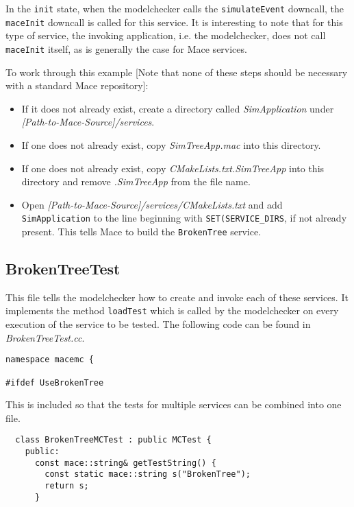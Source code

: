 \documentclass[12pt,letterpaper]{article}
\newenvironment{code}
{\begin{list}{}{\setlength{\leftmargin}{1em}}\item\scriptsize\bfseries}
{\end{list}}
\begin{document}
In the \texttt{init} state, when the modelchecker calls the \texttt{simulateEvent} downcall, the \texttt{maceInit} downcall is called for this service.  It is interesting to note that for this type of service, the invoking application, i.e. the modelchecker, does not call \texttt{maceInit} itself, as is generally the case for Mace services.  


To work through this example [Note that none of these steps should be necessary with a standard Mace repository]:
\begin{itemize} 
\item If it does not already exist, create a directory called \emph{SimApplication} under \emph{[Path-to-Mace-Source]/services}.  
\item If one does not already exist, copy \emph{SimTreeApp.mac} into this directory.  
\item If one does not already exist, copy \emph{CMakeLists.txt.SimTreeApp} into this directory and remove \emph{.SimTreeApp} from the file name.
\item Open \emph{[Path-to-Mace-Source]/services/CMakeLists.txt} and add \texttt{SimApplication} to the line beginning with \texttt{SET(SERVICE\_DIRS}, if not already present.  This tells Mace to build the \texttt{BrokenTree} service.
\end{itemize}

\subsection{BrokenTreeTest}
\label{BrokenTreeTest}

This file tells the modelchecker how to create and invoke each of these services.  It implements the method \texttt{loadTest} which is called by the modelchecker on every execution of the service to be tested.  The following code can be found in \emph{BrokenTreeTest.cc}.

\begin{code}
\begin{verbatim} 
namespace macemc {

#ifdef UseBrokenTree
\end{verbatim}
\end{code}

This is included so that the tests for multiple services can be combined into one file. 

\begin{code}
\begin{verbatim} 
  class BrokenTreeMCTest : public MCTest {
    public:
      const mace::string& getTestString() {
        const static mace::string s("BrokenTree");
        return s;
      }
\end{verbatim}
\end{code}
\end{document}
